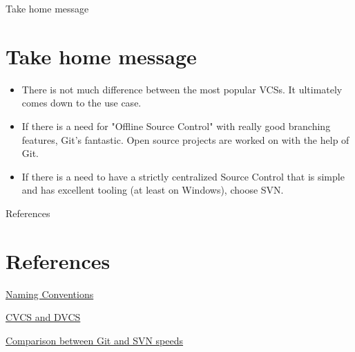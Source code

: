 \documentclass{beamer}
\begin{document}
\begin{frame}{Take home message}
\section{Take home message}
\begin{itemize}
    \item There is not much difference between the most popular VCSs. It ultimately comes down to the use case.
    \item If there is a need for "Offline Source Control" with really good branching features, Git's fantastic. Open source projects are worked on with the help of Git. 
    \item If there is a need to have a strictly centralized Source Control that is simple and has excellent tooling (at least on Windows), choose SVN.
\end{itemize}
    
\end{frame}

\begin{frame}{References}
  \section{References}
    
  \begin{thebibliography}{10}


	\href{https://doctorfreelance.com/file-naming-conventions/}{Naming Conventions}

	\href{https://www.appfusions.com/display/StashSCMImporter/CVCS+vs.+DVCS+In+a+Nutshell
}{CVCS and DVCS}

\href{https://git-scm.com/about/small-and-fast}{Comparison between Git and SVN speeds}




  \end{thebibliography}
\end{frame}
\end{document}
